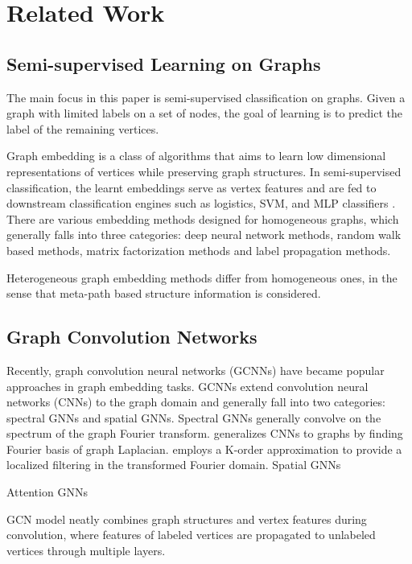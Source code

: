 \section{Related Work}
\label{sec:related}
\subsection{Semi-supervised Learning on Graphs}
The main focus in this paper is semi-supervised classification on graphs. Given a graph with limited labels on a set of nodes, the goal of learning is to predict the label of the remaining vertices.


Graph embedding is a class of algorithms that aims to learn low dimensional representations of vertices while preserving graph structures. In semi-supervised classification, the learnt embeddings serve as vertex features and are fed to downstream classification engines such as logistics, SVM, and MLP classifiers . There are various embedding methods designed for homogeneous graphs, which generally falls into three categories: deep neural network methods\cite{WangC016}, random walk based methods\cite{GroverL16,PerozziAS14}, matrix factorization methods and label propagation methods.

Heterogeneous graph embedding methods differ from homogeneous ones, in the sense that meta-path based structure information is considered.

\subsection{Graph Convolution Networks}
Recently, graph convolution neural networks (GCNNs) have became popular approaches in graph embedding tasks. GCNNs extend convolution neural networks (CNNs) to the graph domain and generally fall into two categories: spectral GNNs and spatial GNNs.
Spectral GNNs generally convolve on the spectrum of the graph Fourier transform. \citet{BrunaZSL13} generalizes CNNs to graphs by finding Fourier basis of graph Laplacian. 
\citet{DefferrardBV16} employs a K-order approximation to provide a localized filtering in the transformed Fourier domain.
Spatial GNNs

Attention GNNs

GCN model neatly combines graph structures and vertex features during convolution, where features of labeled vertices are propagated to unlabeled vertices through multiple layers.






















